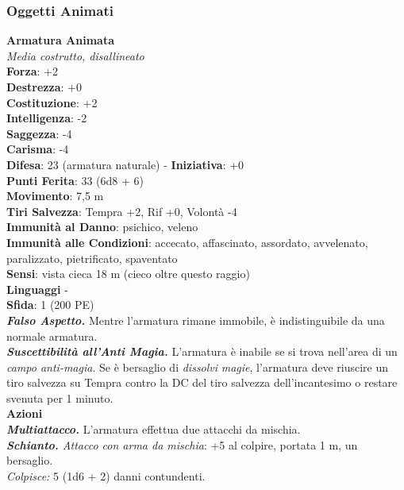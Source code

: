 \begin{multicols}{2}
\subsubsection{Oggetti Animati}

\medskip\textbf{Armatura Animata}\\
\emph{Media costrutto, disallineato}\\
\textbf{Forza}: +2\\
\textbf{Destrezza}: +0\\
\textbf{Costituzione}: +2\\
\textbf{Intelligenza}: -2\\
\textbf{Saggezza}: -4\\
\textbf{Carisma}: -4\\
\textbf{Difesa}: 23 (armatura naturale) - \textbf{Iniziativa}: +0\\
\textbf{Punti Ferita}: 33 (6d8 + 6)\\
\textbf{Movimento}: 7,5 m\\
\textbf{Tiri Salvezza}: Tempra +2, Rif +0, Volontà -4\\
\textbf{Immunità al Danno}: psichico, veleno\\
\textbf{Immunità alle Condizioni}: accecato, affascinato, assordato, avvelenato, paralizzato, pietrificato, spaventato \\
\textbf{Sensi}: vista cieca 18 m (cieco oltre questo raggio)\\
\textbf{Linguaggi} -\\
\textbf{Sfida}: 1 (200 PE)\smallskip\\
\emph{\textbf{Falso Aspetto.}} Mentre l'armatura rimane immobile, è indistinguibile da una normale armatura.\\
\emph{\textbf{Suscettibilità all'Anti Magia.}} L'armatura è inabile se si trova nell'area di un \emph{campo anti-magia}. Se è bersaglio di \emph{dissolvi} \emph{magie}, l'armatura deve riuscire un tiro salvezza su Tempra contro la DC del tiro salvezza dell'incantesimo o restare svenuta per 1 minuto.\\
\smallskip\textbf{Azioni}\\
\emph{\textbf{Multiattacco.}} L'armatura effettua due attacchi da mischia.\\
\emph{\textbf{Schianto.} Attacco con arma da mischia}: +5 al colpire, portata 1 m, un bersaglio.\\
\emph{Colpisce:} 5 (1d6 + 2) danni contundenti.\\


\end{multicols}
